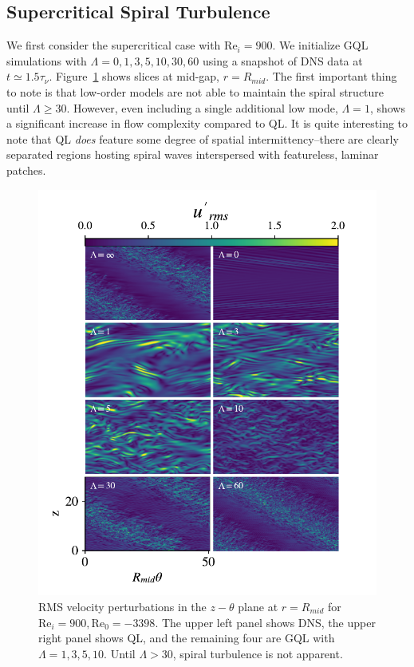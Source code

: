 \documentclass[openacc]{rstransa}%
\newcommand{\Reyn}{\mathrm{Re}}
\begin{document}
\subsection{Supercritical Spiral Turbulence}
We first consider the supercritical case with $\Reyn_i = 900$. We initialize GQL simulations with $\Lambda = 0, 1, 3, 5, 10, 30, 60$ using a snapshot of DNS data at $t \simeq 1.5 \tau_\nu$.  Figure~\ref{fig:rei900_snapshots} shows slices at mid-gap, $r = R_{mid}$. The first important thing to note is that low-order models are not able to maintain the spiral structure until $\Lambda \geq 30$. However, even including a single additional low mode, $\Lambda = 1$, shows a significant increase in flow complexity compared to QL. It is quite interesting to note that QL \emph{does} feature some degree of spatial intermittency--there are clearly separated regions hosting spiral waves interspersed with featureless, laminar patches. 
\begin{figure}
    \centering
    \includegraphics[width=\textwidth]{figs/rei900_snapshots.pdf}
    \caption{RMS velocity perturbations in the $z-\theta$ plane at $r=R_{mid}$ for $\Reyn_i=900, \Reyn_0=-3398$. The upper left panel shows DNS, the upper right panel shows QL, and the remaining four are GQL with $\Lambda = 1,3,5,10$. Until $\Lambda > 30$, spiral turbulence is not apparent.}
    \label{fig:rei900_snapshots}
\end{figure}
\end{document}
